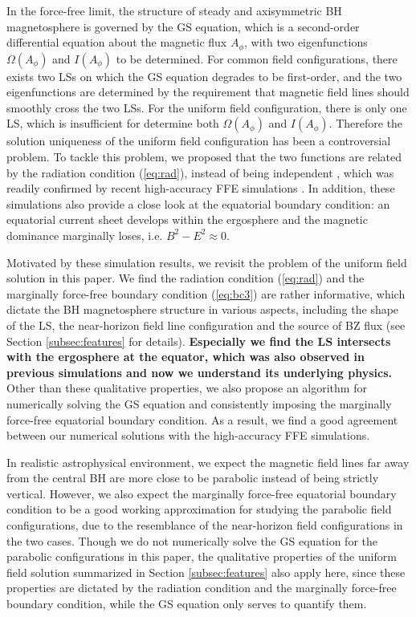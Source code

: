 \documentclass[aps,prd,reprint,nofootinbib, superscriptaddress]{revtex4-1}
\def\Ap{A_\phi}
\begin{document}
In the force-free limit, the structure of steady and axisymmetric BH magnetosphere is governed by
the GS equation, which is a second-order differential equation about the magnetic flux $\Ap$, with two
eigenfunctions $\Omega(\Ap)$ and $I(\Ap)$ to be determined. For common field configurations, there exists
two LSs on which the GS equation degrades to be first-order, and the two eigenfunctions are determined
by the requirement that magnetic field lines should smoothly cross the two LSs.
For the uniform field configuration, there is only one
LS, which is insufficient for determine both  $\Omega(\Ap)$ and $I(\Ap)$.
Therefore the solution uniqueness of the uniform field configuration has been a controversial problem.
To tackle this problem, we  proposed that the two functions are related by the radiation condition (\ref{eq:rad}),
instead of being independent \cite{Pan2017}, which was readily confirmed by recent high-accuracy
FFE simulations \cite{East2018}. In addition, these simulations also provide a close look at the
equatorial boundary condition: an equatorial current sheet develops within the ergosphere and the magnetic dominance marginally loses, i.e. $B^2-E^2\approx 0$.

Motivated by these simulation results, we revisit the problem of the uniform field solution in this paper.
We find the radiation condition (\ref{eq:rad}) and the marginally force-free boundary
condition (\ref{eq:bc3}) are rather informative, which dictate the BH magnetosphere structure
in various aspects, including the shape of the LS, the near-horizon field line configuration and
the source of BZ flux (see Section \ref{subsec:features} for details). {\bf Especially we find the LS
intersects with the ergosphere at the equator, which was also observed in previous simulations \cite[e.g.][]{Carrasco2017, East2018}
and now we understand its underlying physics.}
Other than these qualitative properties,
we also propose an algorithm for numerically solving the GS equation and consistently imposing
the marginally force-free equatorial boundary condition. As a result, we find a good agreement
between our numerical solutions with the high-accuracy FFE simulations.

In realistic astrophysical environment, we expect the magnetic field lines far away from the central BH
are more close to be parabolic instead of being strictly vertical. However, we also expect the marginally
force-free equatorial boundary condition to be a good working approximation for studying the parabolic field configurations,
due to the resemblance of the near-horizon field configurations in the two cases.
Though we do not numerically solve the GS equation for the parabolic configurations in this paper, the qualitative
properties of the uniform field solution summarized in Section \ref{subsec:features} also apply here,
since these properties are dictated by the radiation condition
and the marginally force-free boundary condition, while the GS equation only serves to quantify them.
\end{document}
